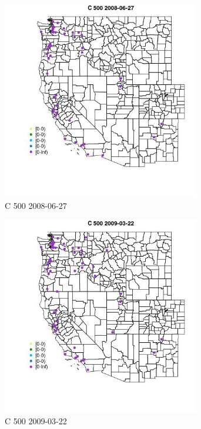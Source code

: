 \begin{figure} 
\centering  
\includegraphics[width=0.77\textwidth]{Code_Outputs/Report_ML_input_PM25_Step4_part_e_de_duplicated_aves_MapObsC_5002008-06-27.jpg} 
\caption{\label{fig:Report_ML_input_PM25_Step4_part_e_de_duplicated_avesMapObsC_5002008-06-27}C 500 2008-06-27} 
\end{figure} 
 

\begin{figure} 
\centering  
\includegraphics[width=0.77\textwidth]{Code_Outputs/Report_ML_input_PM25_Step4_part_e_de_duplicated_aves_MapObsC_5002009-03-22.jpg} 
\caption{\label{fig:Report_ML_input_PM25_Step4_part_e_de_duplicated_avesMapObsC_5002009-03-22}C 500 2009-03-22} 
\end{figure} 
 

